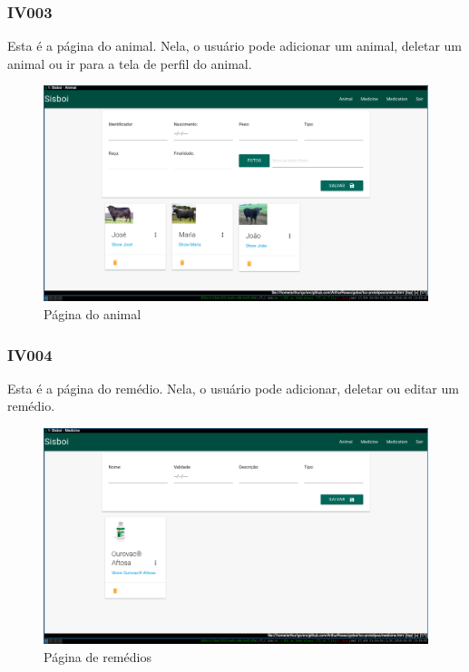\documentclass[12pt]{article}
\begin{document}
\newpage
\subsubsection{IV003}

Esta é a página do animal. Nela, o usuário pode adicionar um animal, deletar um animal ou ir para a tela de perfil do animal.
\begin{figure}[!h]
	\begin{center}
		\caption{Página do animal}
		\includegraphics[width=13cm]{img/prototipos/animal.png}


	\end{center}
\end{figure}
\subsubsection{IV004}

Esta é a página do remédio. Nela, o usuário pode adicionar, deletar ou editar um remédio.
\begin{figure}[!h]
	\begin{center}
		\caption{Página de remédios}
		\includegraphics[width=13cm]{img/prototipos/remedio.png}


	\end{center}
\end{figure}
\end{document}
